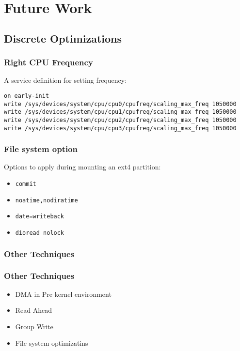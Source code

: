 

\section{Future Work}
\label{fut_work}
\subsection{Discrete Optimizations}
\begin{frame}[fragile]
	\frametitle{Right CPU Frequency}
A service definition for setting frequency:
	\begin{adjustwidth}{-2em}{-2em}
\begin{Verbatim}[fontsize=\small]
on early-init
write /sys/devices/system/cpu/cpu0/cpufreq/scaling_max_freq 1050000
write /sys/devices/system/cpu/cpu1/cpufreq/scaling_max_freq 1050000
write /sys/devices/system/cpu/cpu2/cpufreq/scaling_max_freq 1050000
write /sys/devices/system/cpu/cpu3/cpufreq/scaling_max_freq 1050000
\end{Verbatim}
	\end{adjustwidth}
\end{frame}

\begin{frame}
	\frametitle{File system option}
	Options to apply during mounting an ext4 partition:
	\begin{itemize}
		\item \texttt{commit} \pause
		\item \texttt{noatime,nodiratime} \pause
		\item \texttt{date=writeback} \pause
		\item \texttt{dioread\_nolock} \pause
	\end{itemize}
\end{frame}

\subsubsection{Other Techniques}

\begin{frame}
	\frametitle{Other Techniques}
	\begin{itemize}
		\item DMA in Pre kernel environment \pause
		\item Read Ahead \pause
		\item Group Write \pause
		\item File system optimizatins \pause
	\end{itemize}
\end{frame}
